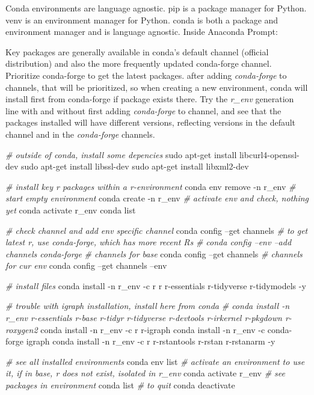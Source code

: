 \documentclass[]{article}
\newenvironment{Shaded}{\begin{snugshade}}{\end{snugshade}}
\newcommand{\CommentTok}[1]{\textcolor[rgb]{0.56,0.35,0.01}{\textit{#1}}}
\newcommand{\ExtensionTok}[1]{#1}
\newcommand{\FunctionTok}[1]{\textcolor[rgb]{0.00,0.00,0.00}{#1}}
\newcommand{\NormalTok}[1]{#1}
\begin{document}
Conda environments are language agnostic. pip is a package manager for
Python. venv is an environment manager for Python. conda is both a
package and environment manager and is language agnostic. Inside
Anaconda Prompt:

Key packages are generally available in conda's default channel
(official distribution) and also the more frequently updated conda-forge
channel. Prioritize conda-forge to get the latest packages. after adding
\emph{conda-forge} to channels, that will be prioritized, so when
creating a new environment, conda will install first from conda-forge if
package exists there. Try the \emph{r\_env} generation line with and
without first adding \emph{conda-forge} to channel, and see that the
packages installed will have different versions, reflecting versions in
the default channel and in the \emph{conda-forge} channels.

\begin{Shaded}
\begin{Highlighting}[]
\CommentTok{# outside of conda, install some depencies}
\FunctionTok{sudo}\NormalTok{ apt-get install libcurl4-openssl-dev}
\FunctionTok{sudo}\NormalTok{ apt-get install libssl-dev}
\FunctionTok{sudo}\NormalTok{ apt-get install libxml2-dev}

\CommentTok{# install key r packages within a r-environment}
\ExtensionTok{conda}\NormalTok{ env remove -n r_env}
\CommentTok{# start empty environment}
\ExtensionTok{conda}\NormalTok{ create -n r_env}
\CommentTok{# activate env and check, nothing yet}
\ExtensionTok{conda}\NormalTok{ activate r_env}
\ExtensionTok{conda}\NormalTok{ list}

\CommentTok{# check channel and add env specific channel}
\ExtensionTok{conda}\NormalTok{ config --get channels}
\CommentTok{# to get latest r, use conda-forge, which has more recent Rs}
\CommentTok{# conda config --env --add channels conda-forge}
\CommentTok{# channels for base}
\ExtensionTok{conda}\NormalTok{ config --get channels}
\CommentTok{# channels for cur env}
\ExtensionTok{conda}\NormalTok{ config --get channels --env}

\CommentTok{# install files}
\ExtensionTok{conda}\NormalTok{ install -n r_env -c r r r-essentials r-tidyverse r-tidymodels -y}

\CommentTok{# trouble with igraph installation, install here from conda}
\CommentTok{# conda install -n r_env r-essentials r-base r-tidyr r-tidyverse r-devtools r-irkernel r-pkgdown r-roxygen2}
\ExtensionTok{conda}\NormalTok{ install -n r_env -c r r-igraph}
\ExtensionTok{conda}\NormalTok{ install -n r_env -c conda-forge igraph}
\ExtensionTok{conda}\NormalTok{ install -n r_env -c r r-rstantools r-rstan r-rstanarm -y}

\CommentTok{# see all installed environments}
\ExtensionTok{conda}\NormalTok{ env list}
\CommentTok{# activate an environment to use it, if in base, r does not exist, isolated in r_env}
\ExtensionTok{conda}\NormalTok{ activate r_env}
\CommentTok{# see packages in environment}
\ExtensionTok{conda}\NormalTok{ list}
\CommentTok{# to quit}
\ExtensionTok{conda}\NormalTok{ deactivate}
\end{Highlighting}
\end{Shaded}
\end{document}
